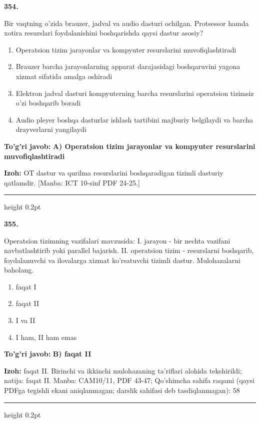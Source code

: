 \documentclass[10pt,a4paper]{article}
\begin{document}
{\bfseries\sffamily\color{ink} 354.}
\par
Bir vaqtning o'zida brauzer, jadval va audio dasturi ochilgan. Protsessor hamda xotira resurslari foydalanishini boshqarishda qaysi dastur asosiy?
\begin{enumerate}[label=\Alph*),leftmargin=9mm]
\item Operatsion tizim jarayonlar va kompyuter resurslarini muvofiqlashtiradi
\item Brauzer barcha jarayonlarning apparat darajasidagi boshqaruvini yagona xizmat sifatida amalga oshiradi
\item Elektron jadval dasturi kompyuterning barcha resurslarini operatsion tizimsiz o'zi boshqarib boradi
\item Audio pleyer boshqa dasturlar ishlash tartibini majburiy belgilaydi va barcha drayverlarni yangilaydi
\end{enumerate}
\begin{tcolorbox}[enhanced,breakable,colback=teal!4,colframe=teal!60!black,boxrule=0.45pt,arc=1.2mm,left=2.7mm,right=2.7mm,top=1.8mm,bottom=1.8mm,before skip=2mm,after skip=2mm]
{\bfseries\sffamily\color{teal}To'g'ri javob:} \textbf{A) Operatsion tizim jarayonlar va kompyuter resurslarini muvofiqlashtiradi}
\par\smallskip
{\bfseries Izoh:} OT dastur va qurilma resurslarini boshqaradigan tizimli dasturiy qatlamdir. [Manba: ICT 10-sinf PDF 24-25.]
\end{tcolorbox}
\vspace{2mm}\hrule height 0.2pt\vspace{3mm}

{\bfseries\sffamily\color{ink} 355.}
\par
Operatsion tizimning vazifalari mavzusida: I. jarayon - bir nechta vazifani navbatlashtirib yoki parallel bajarish. II. operatsion tizim - resurslarni boshqarib, foydalanuvchi va ilovalarga xizmat ko'rsatuvchi tizimli dastur. Mulohazalarni baholang.
\begin{enumerate}[label=\Alph*),leftmargin=9mm]
\item faqat I
\item faqat II
\item I va II
\item I ham, II ham emas
\end{enumerate}
\begin{tcolorbox}[enhanced,breakable,colback=teal!4,colframe=teal!60!black,boxrule=0.45pt,arc=1.2mm,left=2.7mm,right=2.7mm,top=1.8mm,bottom=1.8mm,before skip=2mm,after skip=2mm]
{\bfseries\sffamily\color{teal}To'g'ri javob:} \textbf{B) faqat II}
\par\smallskip
{\bfseries Izoh:} faqat II. Birinchi va ikkinchi mulohazaning ta'riflari alohida tekshirildi; natija: faqat II. Manba: CAM10/11, PDF 43-47; Qo'shimcha sahifa raqami (qaysi PDFga tegishli ekani aniqlanmagan; darslik sahifasi deb tasdiqlanmagan): 58
\end{tcolorbox}
\vspace{2mm}\hrule height 0.2pt\vspace{3mm}
\end{document}
